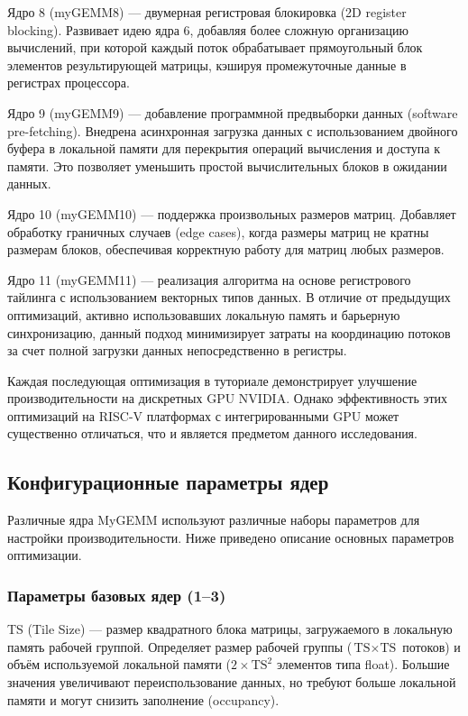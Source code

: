 Ядро 8 (myGEMM8) --- двумерная регистровая блокировка (2D register blocking). Развивает идею ядра 6, добавляя более сложную организацию вычислений, при которой каждый поток обрабатывает прямоугольный блок элементов результирующей матрицы, кэшируя промежуточные данные в регистрах процессора.

Ядро 9 (myGEMM9) --- добавление программной предвыборки данных (software pre-fetching). Внедрена асинхронная загрузка данных с использованием двойного буфера в локальной памяти для перекрытия операций вычисления и доступа к памяти. Это позволяет уменьшить простой вычислительных блоков в ожидании данных.

Ядро 10 (myGEMM10) --- поддержка произвольных размеров матриц. Добавляет обработку граничных случаев (edge cases), когда размеры матриц не кратны размерам блоков, обеспечивая корректную работу для матриц любых размеров.

Ядро 11 (myGEMM11) --- реализация алгоритма на основе регистрового тайлинга с использованием векторных типов данных. В отличие от предыдущих оптимизаций, активно использовавших локальную память и барьерную синхронизацию, данный подход минимизирует затраты на координацию потоков за счет полной загрузки данных непосредственно в регистры.

Каждая последующая оптимизация в туториале демонстрирует улучшение производительности на дискретных GPU NVIDIA. Однако эффективность этих оптимизаций на RISC-V платформах с интегрированными GPU может существенно отличаться, что и является предметом данного исследования.

\subsection{Конфигурационные параметры ядер}

Различные ядра MyGEMM используют различные наборы параметров для настройки производительности. Ниже приведено описание основных параметров оптимизации.

\subsubsection{Параметры базовых ядер (1--3)}

TS (Tile Size) --- размер квадратного блока матрицы, загружаемого в локальную память рабочей группой. Определяет размер рабочей группы ($\text{TS} \times \text{TS}$ потоков) и объём используемой локальной памяти ($2 \times \text{TS}^2$ элементов типа float). Большие значения увеличивают переиспользование данных, но требуют больше локальной памяти и могут снизить заполнение (occupancy).

